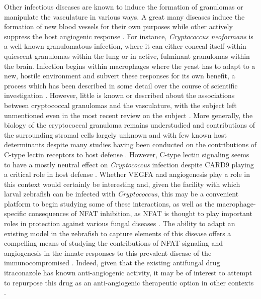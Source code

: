Other infectious diseases are known to induce the formation of granulomas or manipulate the vasculature in various ways. A great many diseases induce the formation of new blood vessels for their own purposes while other actively suppress the host angiogenic response \citep{Osherov2016}. For instance, \textit{Cryptococcus neoformans} is a well-known granulomatous infection, where it can either conceal itself within quiescent granulomas within the lung or in active, fulminant granulomas within the brain. Infection begins within macrophages where the yeast has to adapt to a new, hostile environment and subvert these responses for its own benefit, a process which has been described in some detail over the course of scientific investigation \citep{Coelho2014}. However, little is known or described about the associations between cryptococcal granulomas and the vasculature, with the subject left unmentioned even in the most recent review on the subject \citep{Ristow2021}. More generally, the biology of the cryptococcal granuloma remains understudied and contributions of the surrounding stromal cells largely unknown and with few known host determinants despite many studies having been conducted on the contributions of C-type lectin receptors to host defense \citep{Campuzano2017}. However, C-type lectin signaling seems to have a mostly neutral effect on \textit{Cryptococcus} infection despite CARD9 playing a critical role in host defense \citep{Nakamura2007, Campuzano2017, Walsh2017}. Whether VEGFA and angiogenesis play a role in this context would certainly be interesting and, given the facility with which larval zebrafish can be infected with \textit{Cryptococcus}, this may be a convenient platform to begin studying some of these interactions, as well as the macrophage-specific consequences of NFAT inhibition, as NFAT is thought to play important roles in protection against various fungal diseases \citep{Tenor2015, Davis2016, Greenblatt2010, Goodridge2007, Bojarczuk2016}. The ability to adapt an existing model in the zebrafish to capture elements of this disease offers a compelling means of studying the contributions of NFAT signaling and angiogenesis in the innate responses to this prevalent disease of the immunocompromised \citep{Lin2006b}. Indeed, given that the existing antifungal drug itraconazole has known anti-angiogenic activity, it may be of interest to attempt to repurpose this drug as an anti-angiogenic therapeutic option in other contexts \citep{Nacev2011}.

